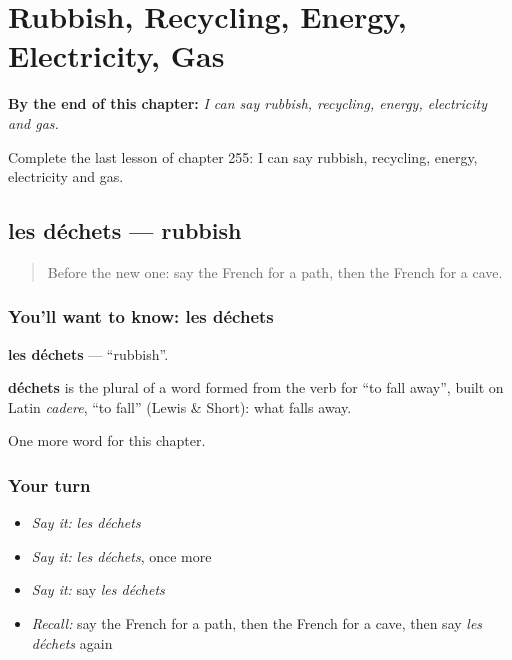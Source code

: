 
\chapter{Rubbish, Recycling, Energy, Electricity, Gas}
\label{ch:fr-rubbish-recycling-energy-electricity-gas}

\begin{chapteropening}
\textbf{By the end of this chapter:} \emph{I can say rubbish, recycling, energy, electricity and gas.}

Complete the last lesson of chapter 255: I can say rubbish, recycling, energy, electricity and gas.
\end{chapteropening}

\section[les déchets]{les déchets — rubbish}

\label{lesson:FR-C255-dechets}



\begin{quote}
Before the new one: say the French for a path, then the French for a cave.
\end{quote}

\subsection*{You'll want to know: les déchets}
\textbf{les déchets} — \textquotedblleft{}rubbish\textquotedblright{}.

\begin{cousinweb}
\textbf{déchets} is the plural of a word formed from the verb for \textquotedblleft{}to fall away\textquotedblright{}, built on Latin \emph{cadere}, \textquotedblleft{}to fall\textquotedblright{} (Lewis \& Short): what falls away.
\end{cousinweb}

\begin{grammarlens}[title={What you've built}]
One more word for this chapter.
\end{grammarlens}

\subsection*{Your turn}
\begin{itemize}
\raggedright
  \item \emph{Say it:} \emph{les déchets}
  \item \emph{Say it:} \emph{les déchets}, once more
  \item \emph{Say it:} say \emph{les déchets}
  \item \emph{Recall:} say the French for a path, then the French for a cave, then say \emph{les déchets} again
\end{itemize}

